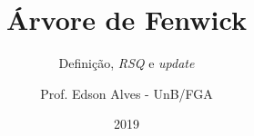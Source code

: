 \title{Árvore de Fenwick}
\subtitle{Definição, \textit{RSQ} e \textit{update}}
\author{Prof. Edson Alves - UnB/FGA}
\date{2019}
